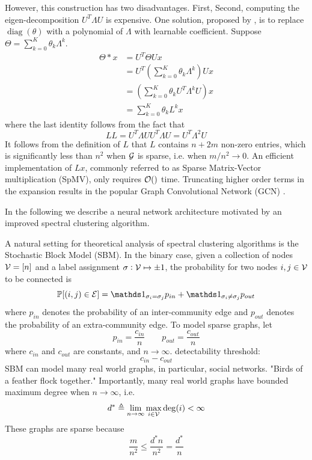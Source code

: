 \documentclass{article}
\DeclareMathOperator{\degree}{deg}
\DeclareMathOperator{\diag}{diag}
\newcommand{\ind}{{\mathds 1}}
\begin{document}
However, this construction has two disadvantages.
First,
Second, computing the eigen-decomposition $U^T \Lambda U$ is expensive.
One solution, proposed by \cite{defferrard2016convolutional}, is to replace $\diag (\theta)$ with a polynomial of $\Lambda$ with learnable coefficient.
Suppose $\Theta = \sum_{k = 0}^K \theta_k \Lambda^k$.
\begin{align*}
\Theta * x
& = U^T \Theta U x \\
& = U^T \left(\sum_{k = 0}^K \theta_k \Lambda^k \right) U x \\
& = \left(\sum_{k = 0}^K \theta_k U^T \Lambda^k U \right) x \\
& = \sum_{k = 0}^K \theta_k L^k x
\end{align*}
where the last identity follows from the fact that
\[
L L
= U^T \Lambda U U^T \Lambda U
= U^T \Lambda^2 U
\]
It follows from the definition of $L$ that $L$ contains $n + 2 m$ non-zero entries, which is significantly less than $n^2$ when ${\mathcal G}$ is sparse, i.e. when $m / n^2 \rightarrow 0$.
An efficient implementation of $L x$, commonly referred to as Sparse Matrix-Vector multiplication (SpMV), only requires ${\mathcal O} ()$ time.
Truncating higher order terms in the expansion results in the popular Graph Convolutional Network (GCN) \cite{kipf2016semi}.

In the following we describe a neural network architecture motivated by an improved spectral clustering algorithm.

A natural setting for theoretical analysis of spectral clustering algorithms is the Stochastic Block Model (SBM).
In the binary case, given a collection of nodes ${\mathcal V} = [n]$ and a label assignment $\sigma: {\mathcal V} \mapsto {\pm 1}$, the probability for two nodes $i, j \in {\mathcal V}$ to be connected is
\[
\bbp [(i, j) \in \cale]
= \ind_{\sigma_i = \sigma_j} p_{in} + \ind_{\sigma_i \ne \sigma_j} p_{out}
\]
where $p_{in}$ denotes the probability of an inter-community edge and $p_{out}$ denotes the probability of an extra-community edge.
To model sparse graphs, let
\[
p_{in} = \frac{c_{in}}n \qquad
p_{out} = \frac{c_{out}}n
\]
where $c_{in}$ and $c_{out}$ are constants, and $n \rightarrow \infty$.
detectability threshold:
\[
c_{in} - c_{out}
\]
SBM can model many real world graphs, in particular, social networks.
"Birds of a feather flock together."
Importantly, many real world graphs have bounded maximum degree when $n \rightarrow \infty$, i.e.
\[
d^* \triangleq \lim_{n \rightarrow \infty} \max_{i \in \calv} \degree (i) < \infty
\]
These graphs are sparse because
\[
\frac{m}{n^2}
\leq \frac{d^* n}{n^2}
= \frac{d^*}n
\]
\end{document}

